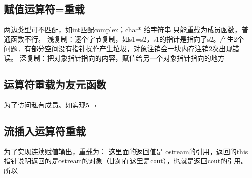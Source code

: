 \documentclass[UTF8]{article}
\begin{document}
\subsection{赋值运算符=重载}
两边类型可不匹配，如int匹配complex；char* 给字符串
只能重载为成员函数，普通函数不行。
浅复制：逐个字节复制，如s1=s2，s1的指针是指向了s2。产生2个问题，有部分空间没有指针操作产生垃圾，对象注销会一块内存注销2次出现错误。
深复制：把对象指针指向的内容，赋值给另一个对象指针指向的地方

\subsection{运算符重载为友元函数}
为了访问私有成员。如实现5+c.

\subsection{流插入运算符重载}
为了实现连续赋值输出，重载为：
这里面的返回值是 ostream的引用，返回的this指针说明返回的是ostream的对象（比如在这里是cout），也就是返回cout的引用。
所以
\begin{comment}

\end{comment}
\end{document}

